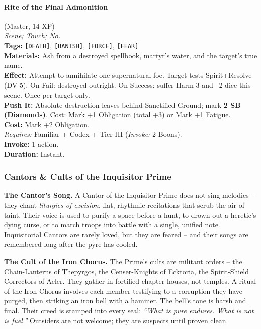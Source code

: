 \paragraph{Rite of the Final Admonition} (Master, 14 XP) \hfill \\
\emph{Scene; Touch; No.} \\
\textbf{Tags:} \texttt{[DEATH]}, \texttt{[BANISH]}, \texttt{[FORCE]}, \texttt{[FEAR]} \\
\textbf{Materials:} Ash from a destroyed spellbook, martyr's water, and the target's true name. \\
\textbf{Effect:} Attempt to annihilate one supernatural foe. Target tests Spirit+Resolve (DV 5). On Fail: destroyed outright. On Success: suffer Harm 3 and --2 dice this scene. Once per target only. \\
\textbf{Push It:} Absolute destruction leaves behind Sanctified Ground; mark \textbf{2 SB (Diamonds)}. Cost: Mark +1 Obligation (total +3) or Mark +1 Fatigue. \\
\textbf{Cost:} Mark +2 Obligation. \\
\textit{Requires:} Familiar + Codex + Tier III (\textit{Invoke:} 2 Boons). \\
\textbf{Invoke:} 1 action. \\
\textbf{Duration:} Instant.

\subsubsection*{Cantors \& Cults of the Inquisitor Prime}

\textbf{The Cantor's Song.} A Cantor of the Inquisitor Prime does not sing melodies -- they chant \textit{liturgies of excision}, flat, rhythmic recitations that scrub the air of taint. Their voice is used to purify a space before a hunt, to drown out a heretic's dying curse, or to march troops into battle with a single, unified note. Inquisitorial Cantors are rarely loved, but they are feared -- and their songs are remembered long after the pyre has cooled.

\textbf{The Cult of the Iron Chorus.} The Prime's cults are militant orders -- the Chain-Lanterns of Thepyrgos, the Censer-Knights of Ecktoria, the Spirit-Shield Correctors of Aeler. They gather in fortified chapter houses, not temples. A ritual of the Iron Chorus involves each member testifying to a corruption they have purged, then striking an iron bell with a hammer. The bell's tone is harsh and final. Their creed is stamped into every seal: \textit{``What is pure endures. What is not is fuel.''} Outsiders are not welcome; they are suspects until proven clean.

